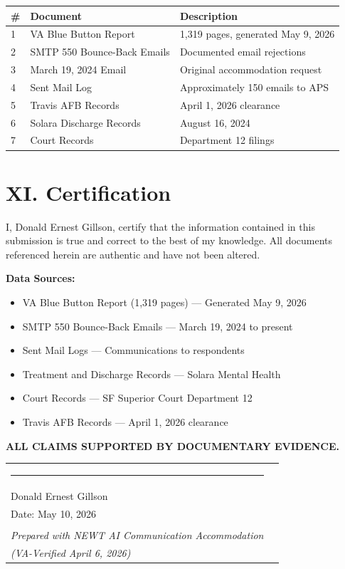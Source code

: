 \documentclass[11pt, a4paper]{article}
\begin{document}
\begin{center}
\begin{tabular}{p{0.5cm}p{5cm}p{6cm}}
\toprule
\textbf{\#} & \textbf{Document} & \textbf{Description} \\
\midrule
1 & VA Blue Button Report & 1,319 pages, generated May 9, 2026 \\
2 & SMTP 550 Bounce-Back Emails & Documented email rejections \\
3 & March 19, 2024 Email & Original accommodation request \\
4 & Sent Mail Log & Approximately 150 emails to APS \\
5 & Travis AFB Records & April 1, 2026 clearance \\
6 & Solara Discharge Records & August 16, 2024 \\
7 & Court Records & Department 12 filings \\
\bottomrule
\end{tabular}
\end{center}

\vspace{0.5cm}

\section{XI. Certification}

I, Donald Ernest Gillson, certify that the information contained in this submission is true and correct to the best of my knowledge. All documents referenced herein are authentic and have not been altered.

\vspace{0.3cm}

\textbf{Data Sources:}
\begin{itemize}
    \item VA Blue Button Report (1,319 pages) --- Generated May 9, 2026
    \item SMTP 550 Bounce-Back Emails --- March 19, 2024 to present
    \item Sent Mail Logs --- Communications to respondents
    \item Treatment and Discharge Records --- Solara Mental Health
    \item Court Records --- SF Superior Court Department 12
    \item Travis AFB Records --- April 1, 2026 clearance
\end{itemize}

\vspace{0.5cm}

\textbf{ALL CLAIMS SUPPORTED BY DOCUMENTARY EVIDENCE.}

\vspace{1cm}
\begin{tabular}{p{8cm}r}
    \rule{7cm}{0.4pt} & \\
    Donald Ernest Gillson & \\
    Date: May 10, 2026 & \\
    & \\
    \small\textit{Prepared with NEWT AI Communication Accommodation} & \\
    \small\textit{(VA-Verified April 6, 2026)} &
\end{tabular}
\end{document}
